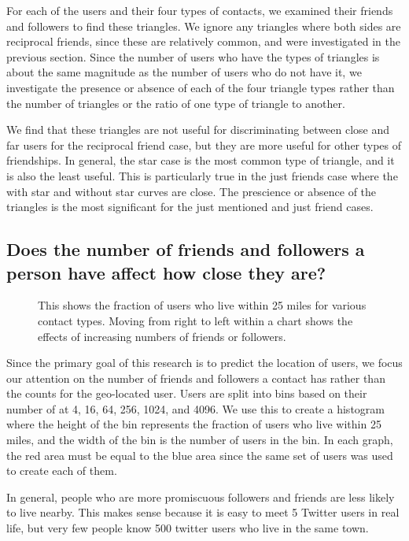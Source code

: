\documentclass{sig-alternate}
\begin{document}
For each of the users and their four types of contacts, we examined their
friends and followers to find these triangles.
We ignore any triangles where both sides are reciprocal friends, since these are relatively common, and were investigated in the previous section.
Since the number of users who have the types of triangles is about the same magnitude as the number of users who do not have it, we investigate the presence or absence of each of the four triangle types rather than the number of triangles or the ratio of one type of triangle to another.

We find that these triangles are not useful for discriminating between close and far users for the reciprocal friend case, but they are more useful for other types of friendships.
In general, the star case is the most common type of triangle, and it is also the least useful. This is particularly true in the just friends case where the with star and without star curves are close.
The prescience or absence of the triangles is the most significant for the just mentioned and just friend cases.

\subsection{Does the number of friends and followers a person have affect how close they are?}

\begin{figure*}
\centering
{}
\caption{
This shows the fraction of users who live within 25 miles for various contact types. Moving from right to left within a chart shows the effects of increasing numbers of friends or followers.
}
\label{fig:LocalAll}
\end{figure*}

Since the primary goal of this research is to predict the location of users, we focus our attention on the number of friends and followers a contact has rather than the counts for the geo-located user. 
Users are split into bins based on their number of at 4, 16, 64, 256, 1024, and 4096.
We use this to create a histogram where the height of the bin represents the fraction of users who live within 25 miles, and the width of the bin is the number of users in the bin.
In each graph, the red area must be equal to the blue area since the same set of users was used to create each of them.

In general, people who are more promiscuous followers and friends are less likely to live nearby. This makes sense because it is easy to meet 5 Twitter users in real life, but very few people know 500 twitter users who live in the same town.
\end{document}
